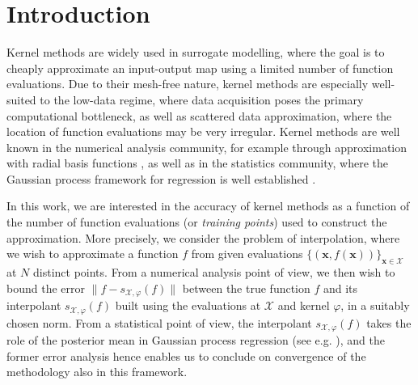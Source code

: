 \documentclass[pdflatex,sn-mathphys-num]{sn-jnl}%
\theoremstyle{thmstyleone}%
\theoremstyle{thmstyletwo}%
\theoremstyle{thmstylethree}%
\begin{document}
\maketitle

\section{Introduction}\label{sec: introduciton}

Kernel methods are widely used in surrogate modelling, where the goal is to cheaply approximate an input-output map using a limited number of function evaluations. Due to their mesh-free nature, kernel methods are especially well-suited to the low-data regime, where data acquisition poses the primary computational bottleneck, as well as scattered data approximation, where the location of function evaluations may be very irregular. Kernel methods are well known in the numerical analysis community, for example through approximation with radial basis functions \cite{wendland_2004,buhmann2000radial,nww05,nww06,adt12}, as well as in the statistics community, where the Gaussian process framework for regression is well established \cite{Rasmussen2005,gramacy2020surrogates,stein,kennedy2001bayesian,hkccr04}. 

In this work, we are interested in the accuracy of kernel methods as a function of the number of function evaluations (or \emph{training points}) used to construct the approximation. More precisely, we consider the problem of interpolation, where we wish to approximate a function $f$ from given evaluations \(\{(\mathbf{x},f(\mathbf{x}))\}_{\mathbf{x}\in\mathcal{X}}\)  at \(N\) distinct points. From a numerical analysis point of view, we then wish to bound the error $\|f - s_{\mathcal{X},\varphi}(f)\|$ between the true function $f$ and its interpolant $s_{\mathcal{X},\varphi}(f)$ built using the evaluations at $\mathcal{X}$ and kernel $\varphi$, in a suitably chosen norm. From a statistical point of view, the interpolant $s_{\mathcal{X},\varphi}(f)$ takes the role of the posterior mean in Gaussian process regression (see e.g. \cite{sss13}), and the former error analysis hence enables us to conclude on convergence of the methodology also in this framework.
\end{document}

